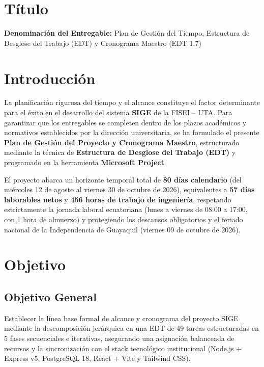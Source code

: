 \documentclass[12pt,a4paper]{article}
\begin{document}
\section{Título}
\textbf{Denominación del Entregable:} Plan de Gestión del Tiempo, Estructura de Desglose del Trabajo (EDT) y Cronograma Maestro (EDT 1.7)



\section{Introducción}
La planificación rigurosa del tiempo y el alcance constituye el factor determinante para el éxito en el desarrollo del sistema \textbf{SIGE} de la FISEI -- UTA. Para garantizar que los entregables se completen dentro de los plazos académicos y normativos establecidos por la dirección universitaria, se ha formulado el presente \textbf{Plan de Gestión del Proyecto y Cronograma Maestro}, estructurado mediante la técnica de \textbf{Estructura de Desglose del Trabajo (EDT)} y programado en la herramienta \textbf{Microsoft Project}.

El proyecto abarca un horizonte temporal total de \textbf{80 días calendario} (del miércoles 12 de agosto al viernes 30 de octubre de 2026), equivalentes a \textbf{57 días laborables netos} y \textbf{456 horas de trabajo de ingeniería}, respetando estrictamente la jornada laboral ecuatoriana (lunes a viernes de 08:00 a 17:00, con 1 hora de almuerzo) y protegiendo los descansos obligatorios y el feriado nacional de la Independencia de Guayaquil (viernes 09 de octubre de 2026).

\section{Objetivo}

\subsection{Objetivo General}
Establecer la línea base formal de alcance y cronograma del proyecto SIGE mediante la descomposición jerárquica en una EDT de 49 tareas estructuradas en 5 fases secuenciales e iterativas, asegurando una asignación balanceada de recursos y la sincronización con el stack tecnológico institucional (Node.js + Express v5, PostgreSQL 18, React + Vite y Tailwind CSS).
\end{document}
